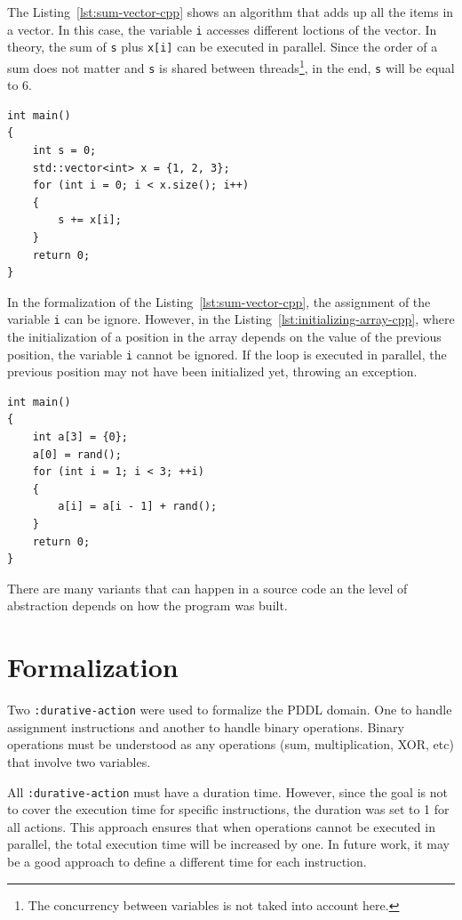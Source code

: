 \documentclass[letterpaper]{article}
\begin{document}
The Listing~\ref{lst:sum-vector-cpp} shows an algorithm that adds up all the items in a vector. In this case, the variable \texttt{i} accesses different loctions of the vector. In theory, the sum of \texttt{s} plus \texttt{x[i]} can be executed in parallel. Since the order of a sum does not matter and \texttt{s} is shared between threads\footnote{The concurrency between variables is not taked into account here.}, in the end, \texttt{s} will be equal to 6.

\begin{lstlisting}[caption=Sum of vector - C++,label=lst:sum-vector-cpp,style=cppStyle]
int main()
{
    int s = 0;
    std::vector<int> x = {1, 2, 3};
    for (int i = 0; i < x.size(); i++)
    {
        s += x[i];
    }
    return 0;
}
\end{lstlisting}

In the formalization of the Listing~\ref{lst:sum-vector-cpp}, the assignment of the variable \texttt{i} can be ignore. However, in the Listing~\ref{lst:initializing-array-cpp}, where the initialization of a position in the array depends on the value of the previous position, the variable \texttt{i} cannot be ignored. If the loop is executed in parallel, the previous position may not have been initialized yet, throwing an exception.

\begin{lstlisting}[caption=Initializing array - C++,label=lst:initializing-array-cpp,style=cppStyle]
int main()
{
    int a[3] = {0};
    a[0] = rand();
    for (int i = 1; i < 3; ++i)
    {
        a[i] = a[i - 1] + rand();
    }
    return 0;
}
\end{lstlisting}

There are many variants that can happen in a source code an the level of abstraction depends on how the program was built.


\section{Formalization}

Two \texttt{:durative-action} were used to formalize the PDDL domain. One to handle assignment instructions and another to handle binary operations. Binary operations must be understood as any operations (sum, multiplication, XOR, etc) that involve two variables.

All \texttt{:durative-action} must have a duration time. However, since the goal is not to cover the execution time for specific instructions, the duration was set to 1 for all actions. This approach ensures that when operations cannot be executed in parallel, the total execution time will be increased by one. In future work, it may be a good approach to define a different time for each instruction.
\end{document}

